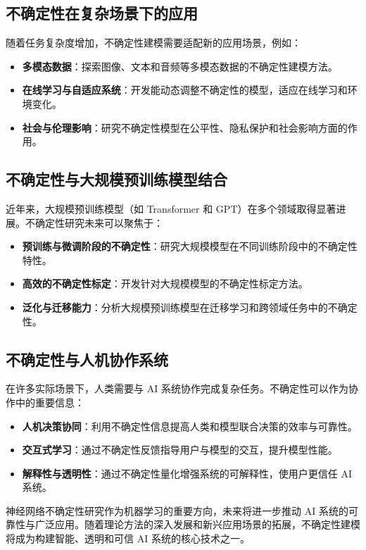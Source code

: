 \subsection{不确定性在复杂场景下的应用}
随着任务复杂度增加，不确定性建模需要适配新的应用场景，例如：
\begin{itemize}
    \item \textbf{多模态数据}：探索图像、文本和音频等多模态数据的不确定性建模方法。
    \item \textbf{在线学习与自适应系统}：开发能动态调整不确定性的模型，适应在线学习和环境变化。
    \item \textbf{社会与伦理影响}：研究不确定性模型在公平性、隐私保护和社会影响方面的作用。
\end{itemize}

\subsection{不确定性与大规模预训练模型结合}
近年来，大规模预训练模型（如 Transformer 和 GPT）在多个领域取得显著进展。不确定性研究未来可以聚焦于：
\begin{itemize}
    \item \textbf{预训练与微调阶段的不确定性}：研究大规模模型在不同训练阶段中的不确定性特性。
    \item \textbf{高效的不确定性标定}：开发针对大规模模型的不确定性标定方法。
    \item \textbf{泛化与迁移能力}：分析大规模预训练模型在迁移学习和跨领域任务中的不确定性。
\end{itemize}

\subsection{不确定性与人机协作系统}
在许多实际场景下，人类需要与 AI 系统协作完成复杂任务。不确定性可以作为协作中的重要信息：
\begin{itemize}
    \item \textbf{人机决策协同}：利用不确定性信息提高人类和模型联合决策的效率与可靠性。
    \item \textbf{交互式学习}：通过不确定性反馈指导用户与模型的交互，提升模型性能。
    \item \textbf{解释性与透明性}：通过不确定性量化增强系统的可解释性，使用户更信任 AI 系统。
\end{itemize}

神经网络不确定性研究作为机器学习的重要方向，未来将进一步推动 AI 系统的可靠性与广泛应用。随着理论方法的深入发展和新兴应用场景的拓展，不确定性建模将成为构建智能、透明和可信 AI 系统的核心技术之一。



